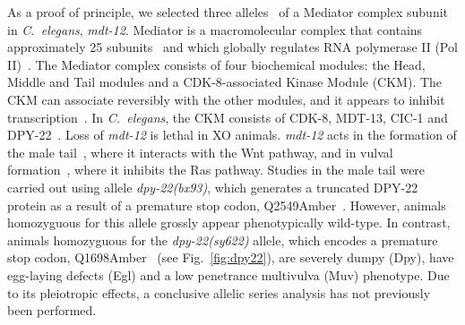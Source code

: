 \documentclass[10pt, twocolumn]{article}
\newcommand{\cel}{\emph{C.~elegans}}
\newcommand{\gene}[1]{\mbox{\emph{#1}}}
\newcommand{\protein}[1]{\mbox{\uppercase{#1}}}
\newcommand{\dpy}{\gene{mdt-12}}
\begin{document}

As a proof of principle, we selected three alleles~\cite{Zhang2000,Moghal2003}
of a Mediator complex subunit in \cel{}, \dpy{}. Mediator is a macromolecular
complex that contains approximately 25 subunits~\cite{Jeronimo2017} and which
globally regulates RNA polymerase II (Pol II)~\cite{Allen2015,Takagi2006}. The
Mediator complex consists of four biochemical modules: the Head, Middle and Tail
modules and a CDK-8-associated Kinase Module (CKM). The CKM can associate
reversibly with the other modules, and it appears to inhibit
transcription~\cite{Knuesel2009,Elmlund2006}. In \cel{}, the CKM consists of
\protein{cdk-8}, \protein{mdt-13}, \protein{cic-1} and
\protein{DPY-22}~\cite{Grants2015}. Loss of \dpy{} is lethal in XO
animals\cite{Hodgkin1979,Meneely1987}. \dpy{} acts in the formation of the male
tail~\cite{Zhang2000}, where it interacts with the Wnt pathway, and in vulval
formation~\cite{Moghal2003a}, where it inhibits the Ras pathway. Studies in the
male tail were carried out using allele \gene{dpy-22(bx93)}, which generates a
truncated \protein{dpy-22} protein as a result of a premature stop codon,
Q2549Amber~\cite{Zhang2000}. However, animals homozyguous for
this allele grossly appear phenotypically wild-type. In contrast, animals
homozyguous for the \gene{dpy-22(sy622)} allele, which encodes a premature stop
codon, Q1698Amber~\cite{Moghal2003} (see Fig.~\ref{fig:dpy22}), are severely
dumpy (Dpy), have egg-laying defects (Egl) and a low penetrance multivulva
(Muv) phenotype. Due to its pleiotropic effects, a conclusive allelic series
analysis has not previously been performed.
\end{document}
